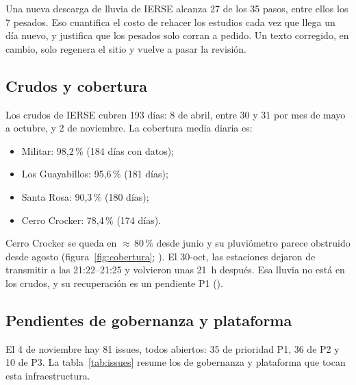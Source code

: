 \documentclass{sosg-informe}
\begin{document}
Una nueva descarga de lluvia de IERSE alcanza 27 de los 35 pasos, entre ellos los 7 pesados. Eso cuantifica el costo de rehacer los estudios cada vez que llega un día nuevo, y justifica que los pesados solo corran a pedido. Un texto corregido, en cambio, solo regenera el sitio y vuelve a pasar la revisión.

\subsection{Crudos y cobertura}
Los crudos de IERSE cubren 193 días: 8 de abril, entre 30 y 31 por mes de mayo a octubre, y 2 de noviembre. La cobertura media diaria es:
\begin{itemize}
  \item Militar: 98,2\,\% (184 días con datos);
  \item Los Guayabillos: 95,6\,\% (181 días);
  \item Santa Rosa: 90,3\,\% (180 días);
  \item Cerro Crocker: 78,4\,\% (174 días).
\end{itemize}
Cerro Crocker se queda en ${\approx}\,80$\,\% desde junio y su pluviómetro parece obstruido desde agosto (figura~\ref{fig:cobertura}; ). El 30-oct, las estaciones dejaron de transmitir a las 21:22--21:25 y volvieron unas 21~h después. Esa lluvia no está en los crudos, y su recuperación es un pendiente P1 ().

\subsection{Pendientes de gobernanza y plataforma}
El 4 de noviembre hay 81 issues, todos abiertos: 35 de prioridad P1, 36 de P2 y 10 de P3. La tabla~\ref{tab:issues} resume los de gobernanza y plataforma que tocan esta infraestructura.
\end{document}
